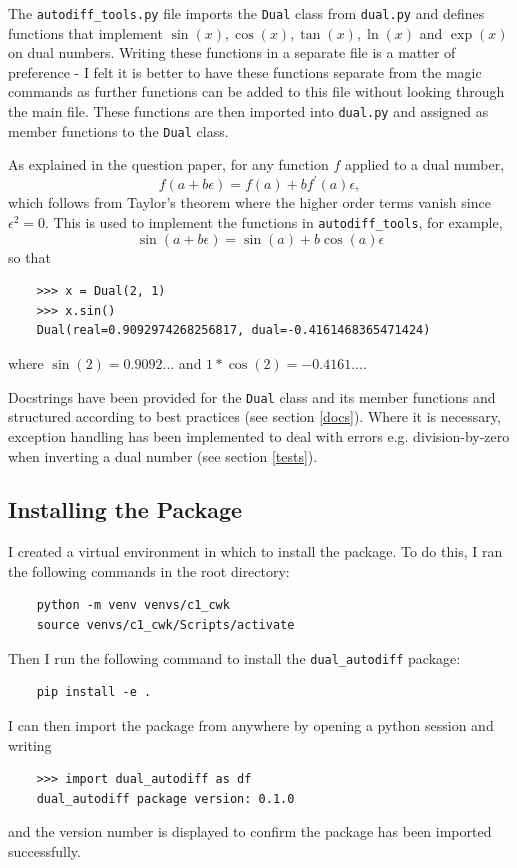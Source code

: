 \documentclass{article}
\begin{document}
The \texttt{autodiff\_tools.py} file imports the \texttt{Dual} class from \texttt{dual.py} and defines functions that implement $\sin(x), \cos(x), \tan(x), \ln(x)$ and $\exp(x)$ on dual numbers. Writing these functions in a separate file is a matter of preference - I felt it is better to have these functions separate from the magic commands as further functions can be added to this file without looking through the main file. These functions are then imported into \texttt{dual.py} and assigned as member functions to the \texttt{Dual} class.

As explained in the question paper, for any function $f$ applied to a dual number,
\[
f(a+b\epsilon) = f(a) + b f^\prime (a) \epsilon,
\]
which follows from Taylor's theorem where the higher order terms vanish since $\epsilon^2 =0$. This is used to implement the functions in \texttt{autodiff\_tools}, for example, 
\[
\sin(a+b\epsilon) = \sin(a) + b \cos(a) \epsilon
\]
so that 
\begin{lstlisting}
    >>> x = Dual(2, 1)
    >>> x.sin()
    Dual(real=0.9092974268256817, dual=-0.4161468365471424)
\end{lstlisting}
where $\sin(2)=0.9092...$ and $1*\cos(2)=-0.4161...$.

Docstrings have been provided for the \texttt{Dual} class and its member functions and structured according to best practices (see section \ref{docs}). Where it is necessary, exception handling has been implemented to deal with errors e.g. division-by-zero when inverting a dual number (see section \ref{tests}).

\subsection{ Installing the Package }
I created a virtual environment in which to install the package. To do this, I ran the following commands in the root directory:
\begin{lstlisting}
    python -m venv venvs/c1_cwk
    source venvs/c1_cwk/Scripts/activate
\end{lstlisting}
Then I run the following command to install the \texttt{dual\_autodiff} package:
\begin{lstlisting}
    pip install -e .
\end{lstlisting}
I can then import the package from anywhere by opening a python session and writing
\begin{lstlisting}
    >>> import dual_autodiff as df
    dual_autodiff package version: 0.1.0
\end{lstlisting}
and the version number is displayed to confirm the package has been imported successfully.
\end{document}
